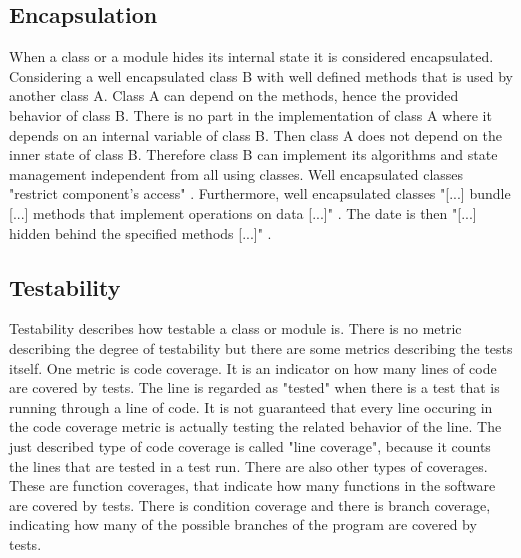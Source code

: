 \subsection*{Encapsulation}
\label{encapsulation}
When a class or a module hides its internal state it is considered encapsulated. Considering a well encapsulated class B with well defined methods that is used by another class A.  Class A can depend on the methods, hence the provided behavior of class B.
There is no part in the implementation of class A where it depends on an internal variable of class B. Then class A does not depend on the inner state of class B. Therefore class B can implement its algorithms and state management independent from all using classes. 
Well encapsulated classes "restrict component's access" \cite[Encapsulation]{wiki}. Furthermore, well encapsulated classes "[...] bundle [...] methods that implement operations on data [...]" \cite[Encapuslation]{wiki}. The date is then "[...] hidden behind the specified methods [...]" \cite[Encapsulation]{wiki}.

\subsection*{Testability}
\label{testability}
Testability describes how testable a class or module is. There is no metric describing the degree of testability but there are some metrics describing the tests itself. 
One metric is code coverage. It is an indicator on how many lines of code are covered by tests. The line is regarded as "tested" when there is a test that is running through a line of code. It is not guaranteed that every line occuring in the code coverage metric is actually testing the related behavior of the line. 
The just described type of code coverage is called "line coverage", because it counts the lines that are tested in a test run. There are also other types of coverages. These are function coverages, that indicate how many functions in the software are covered by tests. There is condition coverage and there is branch coverage, indicating how many of the possible branches of the program are covered by tests. 

